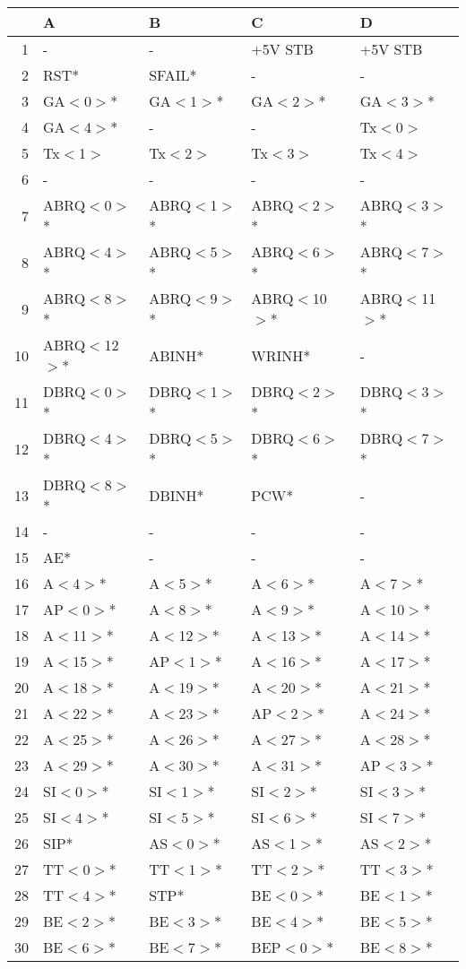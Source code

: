%
%
\begin{table}[hb]
   \begin{center}
\begingroup
\setlength{\tabcolsep}{6pt} %
\renewcommand{\arraystretch}{0.9} %
   \begin{tabular}{|r|l|l|l|l|} \hline
   & A             & B&C&D\\ \hline
1  & -             & -&+5V STB&+5V STB\\
2  & RST*          & SFAIL*&-&-\\
3  & GA$<$0$>$*    & GA$<$1$>$*&GA$<$2$>$*&GA$<$3$>$*\\
4  & GA$<$4$>$*    & -&-&Tx$<$0$>$\\
5  & Tx$<$1$>$     & Tx$<$2$>$&Tx$<$3$>$&Tx$<$4$>$\\
6  & -             & -&-&-\\
7  & ABRQ$<$0$>$*  & ABRQ$<$1$>$*&ABRQ$<$2$>$*&ABRQ$<$3$>$*\\
8  & ABRQ$<$4$>$*  & ABRQ$<$5$>$*&ABRQ$<$6$>$*&ABRQ$<$7$>$*\\
9  & ABRQ$<$8$>$*  & ABRQ$<$9$>$* & ABRQ$<$10$>$* & ABRQ$<$11$>$*\\
10 & ABRQ$<$12$>$* & ABINH*&WRINH*&-\\
11 & DBRQ$<$0$>$*  & DBRQ$<$1$>$*&DBRQ$<$2$>$*&DBRQ$<$3$>$*\\
12 & DBRQ$<$4$>$*  & DBRQ$<$5$>$*&DBRQ$<$6$>$*&DBRQ$<$7$>$*\\
13 & DBRQ$<$8$>$*  & DBINH*&PCW*&-\\
14 & -             & -&-&-\\
15 & AE*           & -&-&-\\
16 & A$<$4$>$*     & A$<$5$>$*&A$<$6$>$*&A$<$7$>$*\\
17 & AP$<$0$>$*    & A$<$8$>$*&A$<$9$>$*&A$<$10$>$*\\
18 & A$<$11$>$*    & A$<$12$>$*&A$<$13$>$*&A$<$14$>$*\\
19 & A$<$15$>$*    & AP$<$1$>$*&A$<$16$>$*&A$<$17$>$*\\
20 & A$<$18$>$*    & A$<$19$>$*&A$<$20$>$*&A$<$21$>$*\\
21 & A$<$22$>$*    & A$<$23$>$*&AP$<$2$>$*&A$<$24$>$*\\
22 & A$<$25$>$*    & A$<$26$>$*&A$<$27$>$*&A$<$28$>$*\\
23 & A$<$29$>$*    & A$<$30$>$*&A$<$31$>$*&AP$<$3$>$*\\
24 & SI$<$0$>$*    & SI$<$1$>$*&SI$<$2$>$*&SI$<$3$>$*\\
25 & SI$<$4$>$*    & SI$<$5$>$*&SI$<$6$>$*&SI$<$7$>$*\\
26 & SIP*          & AS$<$0$>$*&AS$<$1$>$*&AS$<$2$>$*\\
27 & TT$<$0$>$*    & TT$<$1$>$*&TT$<$2$>$*&TT$<$3$>$*\\
28 & TT$<$4$>$*    & STP*&BE$<$0$>$*&BE$<$1$>$*\\
29 & BE$<$2$>$*    & BE$<$3$>$*&BE$<$4$>$*&BE$<$5$>$*\\
30 & BE$<$6$>$*    & BE$<$7$>$*&BEP$<$0$>$*&BE$<$8$>$*\\
\hline
   \end{tabular}
\endgroup
   \end{center}
\end{table}
